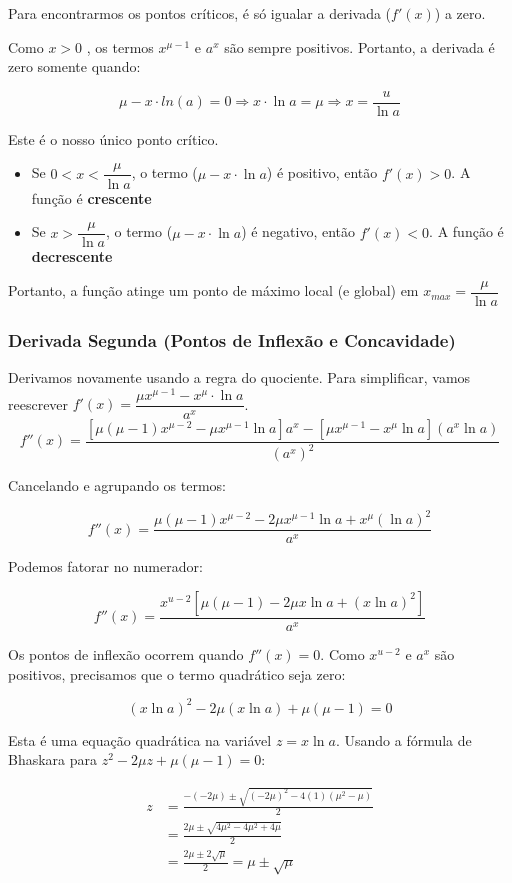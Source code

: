 \documentclass[../resumo.tex]{subfiles}
\begin{document}
	Para encontrarmos os pontos críticos, é só igualar a derivada ($f'(x)$) a zero.

	Como $x > 0$ , os	termos $x^{\mu-1}$ e $a^x$ são sempre positivos.
	Portanto, a derivada é zero somente quando:

	\[ \mu-x \cdot ln(a) = 0 \Rightarrow x \cdot \ln a = \mu \Rightarrow x = \frac{u}{\ln a} \]

	Este é o nosso único ponto crítico.

	\begin{itemize}
		\item Se $0 < x < \dfrac{\mu}{\ln a}$, o termo ($\mu-x \cdot \ln a$) é positivo, então $f'(x) > 0$. 
			A função é \textbf{crescente}
		\item Se $x > \dfrac{\mu}{\ln a}$, o termo ($\mu-x \cdot \ln a$) é negativo, então $f'(x) < 0$. 
			A função é \textbf{decrescente}
	\end{itemize}

	Portanto, a função atinge um ponto de máximo local (e global) em $x_{max} = \dfrac{\mu}{\ln a}$

	\subsubsection{Derivada Segunda (Pontos de Inflexão e Concavidade)}

	Derivamos novamente usando a regra do quociente. Para simplificar, vamos reescrever
	$f'(x) = \dfrac{\mu x^{\mu-1}-x^\mu \cdot \ln a}{a^x}$.
	\[ f''(x) = \frac{[\mu(\mu-1)x^{\mu-2} - \mu x^{\mu-1}\ln a]a^x - [\mu x^{\mu-1} - x^\mu \ln a](a^x \ln
	a)}{(a^x)^2} \]

	Cancelando e agrupando os termos:

	\[ f''(x) = \frac{\mu(\mu-1)x^{\mu-2} - 2\mu x^{\mu-1}\ln a + x^\mu(\ln a)^2}{a^x} \]

	Podemos fatorar no numerador:

	\[ f''(x) = \frac{x^{u-2}[\mu (\mu - 1) - 2 \mu x \ln a + (x \ln a)^2]}{a^x} \]

	Os pontos de inflexão ocorrem quando $f''(x) = 0$. Como $x^{u-2}$ e $a^x$ são positivos, precisamos que o
	termo quadrático seja zero:

	\[ (x \ln a)^2 - 2 \mu (x \ln a) + \mu(\mu - 1) = 0 \]

	Esta é uma equação quadrática na variável $z = x \ln a$. Usando a fórmula de Bhaskara para $z^2 - 2 \mu z + \mu(\mu - 1) = 0$:
	
	\begin{align*}
		z &= \frac{-(-2\mu) \pm \sqrt{(-2\mu)^2 - 4(1)(\mu^2-\mu)}}{2}  \\
		  &= \frac{2\mu \pm \sqrt{4\mu^2 - 4\mu^2 + 4\mu}}{2} \\
			&= \frac{2\mu \pm 2\sqrt{\mu}}{2} = \mu \pm \sqrt{\mu}
	\end{align*}
\end{document}
